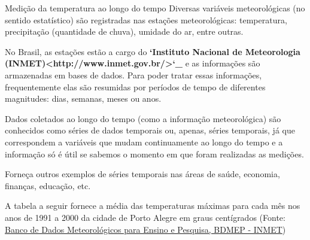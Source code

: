 \begin{task}{ Medição da temperatura ao longo do tempo}
Diversas variáveis meteorológicas (no sentido estatístico) são registradas nas estações meteorológicas: temperatura, precipitação (quantidade de chuva), umidade do ar, entre outras.

No Brasil, as estações estão a cargo do {\color{red}\bfseries{}{}`Instituto Nacional de Meteorologia (INMET)\textless{}http://www.inmet.gov.br/\textgreater{}{}`\_} e as informações são armazenadas em bases de dados. Para poder tratar essas informações, frequentemente elas são resumidas por períodos de tempo de diferentes magnitudes: dias, semanas, meses ou anos.

Dados coletados ao longo do tempo (como a informação meteorológica) são conhecidos como séries de dados temporais ou, apenas, séries temporais, já que correspondem a variáveis que mudam continuamente ao longo do tempo e a informação só é útil se sabemos o momento em que foram realizadas as medições.
\end{task}

\begin{reflection}

Forneça outros exemplos de séries temporais nas áreas de saúde, economia, finanças, educação, etc.
\end{reflection}

A tabela a seguir fornece a média das temperaturas máximas para cada mês nos anos de 1991 a 2000 da cidade de Porto Alegre em graus centígrados (Fonte: \href{http://www.inmet.gov.br/portal/index.php?r=bdmep/bdmep}{Banco de Dados Meteorológicos para Ensino e Pesquisa, BDMEP - INMET})


